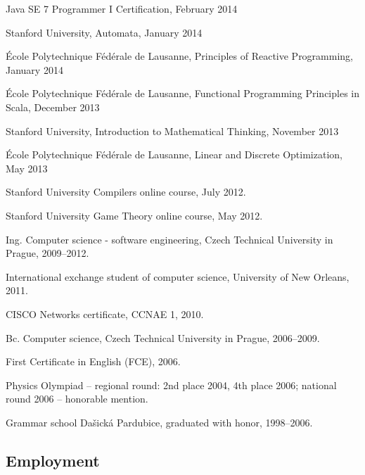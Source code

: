 \documentclass[czech]{article}
\renewenvironment{itemize}{
  \begin{list}{}{
    \setlength{\leftmargin}{1.5em}
  }
}{
  \end{list}
}
\begin{document}
\begin{itemize}
  \item Java SE 7 Programmer I Certification, February 2014
  \item Stanford University, Automata, January 2014
  \item École Polytechnique Fédérale de Lausanne, Principles of Reactive Programming, January 2014
  \item École Polytechnique Fédérale de Lausanne, Functional Programming Principles in Scala, December 2013
  \item Stanford University, Introduction to Mathematical Thinking, November 2013
  \item École Polytechnique Fédérale de Lausanne, Linear and Discrete Optimization, May 2013
  \item Stanford University Compilers online course, July 2012.
  \item Stanford University Game Theory online course, May 2012.
	\item Ing. Computer science - software engineering, Czech Technical University
  in Prague, 2009--2012.

  \item International exchange student of computer science, University of New
  Orleans, 2011.
  \item CISCO Networks certificate, CCNAE 1, 2010.
  
  \item Bc. Computer science, Czech Technical University in Prague, 2006--2009.
  \item First Certificate in English (FCE), 2006.
  \item Physics Olympiad -- regional round: 2nd place 2004, 4th place 2006;
  national round 2006 -- honorable mention.
  \item Grammar school Dašická Pardubice, graduated with honor, 1998--2006.
\end{itemize}


\textcolor{coolblack}{\section*{Employment}}
\end{document}
